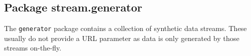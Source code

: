 \subsection{Package stream.generator}

The \texttt{generator} package contains a collection of synthetic data
streams. These usually do not provide a URL parameter as data is only
generated by those streams on-the-fly.




